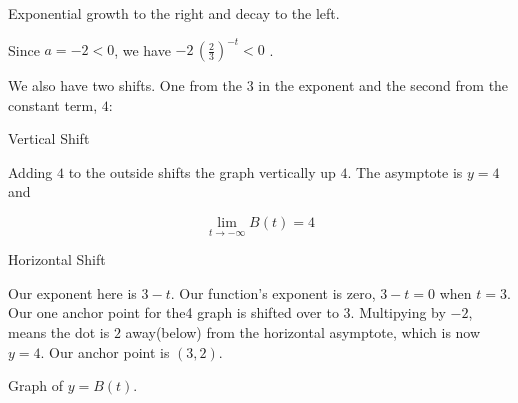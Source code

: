 \documentclass{ximera}
\begin{document}
\begin{example}
Exponential growth to the right and decay to the left.






Since $a = -2 < 0$, we have $-2 \, \left( \frac{2}{3} \right)^{-t} < 0$ .



We also have two shifts. One from the $3$ in the exponent and the second from the constant term, $4$:




Vertical Shift


Adding $4$ to the outside shifts the graph vertically up $4$.  The asymptote is $y = 4$ and 

\[ \lim\limits_{t \to -\infty} B(t) = 4 \]



Horizontal Shift

Our exponent here is $3 - t$.  Our function's exponent is zero, $3-t=0$ when $t=3$. Our one anchor point for the4 graph is shifted over to $3$.  Multipying by $-2$, means the dot is $2$ away(below) from the horizontal asymptote, which is now $y=4$.  Our anchor point is $(3, 2)$.








Graph of $y = B(t)$.

\begin{image}
\end{image}






\end{example}
\end{document}
